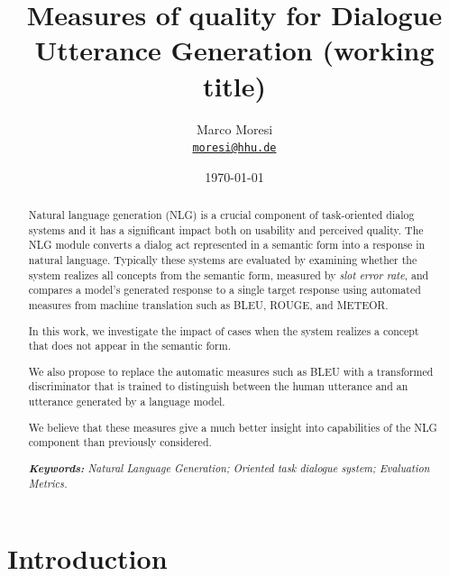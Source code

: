 \documentclass[11pt]{article}
\title{Measures of quality for Dialogue Utterance Generation (working title)
}
\author{Marco Moresi\\%
    \href{mailto:moresi@hhu.de}{\texttt{moresi@hhu.de}} %
    }
\date{\today}
\begin{document}
{
\maketitle
\begin{abstract}
Natural language generation (NLG) is a crucial component of task-oriented dialog systems and it has a significant impact both on usability and perceived quality. The NLG module converts a dialog act represented in a semantic form into a response in natural language. Typically these systems are evaluated by examining whether the system realizes all concepts from the semantic form,  measured by \emph{slot error rate}, and compares a model's generated response to a single target response using automated measures from machine translation such as BLEU, ROUGE, and METEOR.

In this work, we investigate the impact of cases when the system realizes a concept that does not appear in the semantic form.

We also propose to replace the automatic measures such as BLEU with a transformed discriminator that is trained to distinguish between the human utterance and an utterance generated by a language model.

We believe that these measures give a much better insight into capabilities of the NLG component than previously considered.



\noindent
\textit{\textbf{Keywords: }%
Natural Language Generation; Oriented task dialogue system; Evaluation Metrics.} \\ %

\end{abstract}
}


\section{Introduction}
\end{document}
